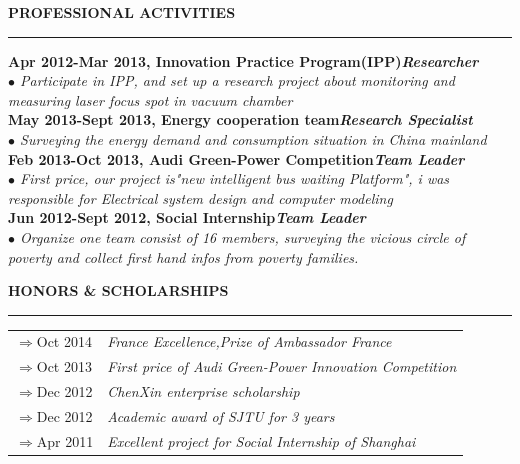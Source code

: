 \documentclass[a4paper,12pt,final]{memoir}
\newcommand{\myThemeColor}{Maroon}
\newcommand{\SmallSep}{\vspace{0.9em}}
\newcommand{\smallsep}{\vspace{0.45em}}
\newcommand{\CVSection}[1]
	{\Large\textbf{\textsf{#1}}\par
	\smallsep\normalsize\normalfont}
\newcommand{\CVItem}[1]
	{\textbf{\color{\myThemeColor} #1}}
\begin{document}
\CVSection{PROFESSIONAL ACTIVITIES}
\hrule
\SmallSep
\CVItem{Apr 2012-Mar 2013, Innovation Practice Program(IPP)\hfill\emph{Researcher}}\\
\textit{$\bullet$ Participate in IPP, and set up a research project about monitoring and measuring laser focus spot in vacuum chamber } 
\\
\CVItem{May 2013-Sept 2013, Energy cooperation team\hfill\emph{Research Specialist}}\\
\textit{$\bullet$ Surveying the energy demand and consumption situation in China mainland} 
\\
\CVItem{Feb 2013-Oct 2013, Audi Green-Power Competition\hfill\emph{Team Leader}}\\
\textit{$\bullet$ First price, our project is"new intelligent bus waiting Platform", i was responsible for Electrical system design and computer modeling}
\\
\CVItem{Jun 2012-Sept 2012, Social Internship\hfill\emph{Team Leader}}\\
\textit{$\bullet$ Organize one team consist of 16 members, surveying the vicious circle of poverty and collect first hand infos from poverty families.} 

\CVSection{HONORS \& SCHOLARSHIPS}
\hrule
\SmallSep
\begin{tabular}{l|l}
	$\Rightarrow$Oct 2014&\textit{France Excellence,Prize of Ambassador France}\footnotesize\\
	$\Rightarrow$Oct 2013&\textit{First price of Audi Green-Power Innovation Competition}\\
	$\Rightarrow$Dec 2012&\textit{ChenXin enterprise scholarship}\\
	$\Rightarrow$Dec 2012&\textit{Academic award of SJTU for 3 years}\\
	$\Rightarrow$Apr 2011&\textit{Excellent project for Social Internship of Shanghai}\footnotesize\\

\end{tabular}{}
\end{document}
